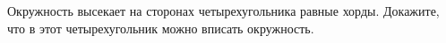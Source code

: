 \begin{ex}
	\begin{condition}
		Окружность высекает на сторонах четырехугольника равные хорды. Докажите, что в этот четырехугольник можно вписать окружность.
	\end{condition}
\end{ex}